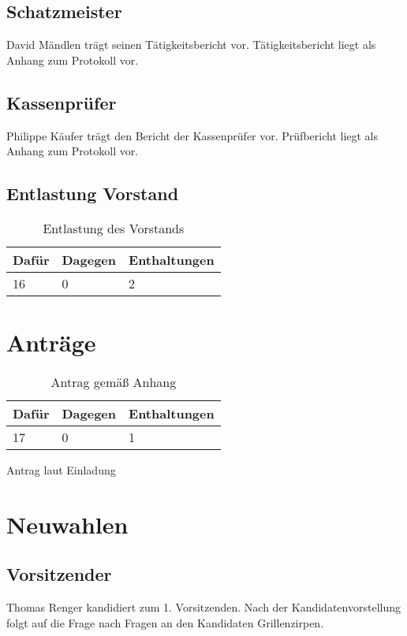 \documentclass[a4paper]{scrartcl}
\begin{document}
\subsection{Schatzmeister}
David Mändlen trägt seinen Tätigkeitsbericht vor.
Tätigkeitsbericht liegt als Anhang zum Protokoll vor.

\subsection{Kassenprüfer}
Philippe Käufer trägt den Bericht der Kassenprüfer vor.
Prüfbericht liegt als Anhang zum Protokoll vor.

\subsection{Entlastung Vorstand}
\begin{table}[h]
	\begin{tabularx}{\textwidth}{XXX}
		Dafür & Dagegen & Enthaltungen\\
		\toprule
		16 & 0 & 2\\
	\end{tabularx}
	\caption{Entlastung des Vorstands}
\end{table}

\clearpage

\section{Anträge}
\begin{table}[h]
	\begin{tabularx}{\textwidth}{XXX}
		Dafür & Dagegen & Enthaltungen\\
		\toprule
		17 & 0 & 1\\
	\end{tabularx}
	\caption{Antrag gemäß Anhang}
\end{table}


Antrag laut Einladung

\clearpage

\section{Neuwahlen}
\subsection{Vorsitzender}
Thomas Renger kandidiert zum 1. Vorsitzenden.
Nach der Kandidatenvorstellung folgt auf die Frage nach Fragen an den Kandidaten Grillenzirpen.
\end{document}
